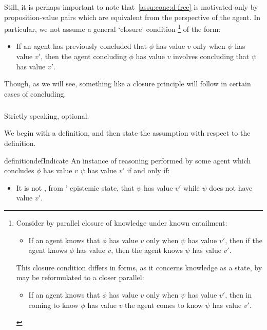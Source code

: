 \begin{note}[Descriptions]
  Still, it is perhaps important to note that~\autoref{assu:conc:d-free} is motivated only by proposition-value pairs which are equivalent from the perspective of the agent.
  In particular, we not assume a general `closure' condition%
  \footnote{
    Consider by parallel closure of knowledge under known entailment:
    \begin{itemize}
    \item If an agent knows that \(\phi\) has value \(v\) only when \(\psi\) has value \(v'\), then if the agent knows \(\phi\) has value \(v\), then the agent knows \(\psi\) has value \(v'\).
    \end{itemize}
    This closure condition differs in forms, as it concerns knowledge as a state, by may be reformulated to a closer parallel:
        \begin{itemize}
    \item If an agent knows that \(\phi\) has value \(v\) only when \(\psi\) has value \(v'\), then in coming to know \(\phi\) has value \(v\) the agent comes to know \(\psi\) has value \(v'\).
    \end{itemize}
  }
  of the form:
  \begin{itemize}
  \item If an agent has previously concluded that \(\phi\) has value \(v\) only when \(\psi\) has value \(v'\), then the agent concluding \(\phi\) has value \(v\) involves concluding that \(\psi\) has value \(v'\).
  \end{itemize}

  Though, as we will see, something like a closure principle will follow in certain cases of concluding.
\end{note}

\subparagraph{}

\begin{note}
  Strictly speaking, optional.

  We begin with a definition, and then state the assumption with respect to the definition.
\end{note}

\begin{note}
  \begin{restatable}[\indicateN{2}]{definition}{defIndicate}
    \label{def:indication}
    An instance of reasoning performed by some agent \vAgent{} which concludes \(\phi\) has value \(v\) \emph{} \(\psi\) has value \(v'\) if and only if:
    \begin{itemize}
    \item
      It is not \epPAd{}, from \vAgent{}' epistemic state, that \(\psi\) has value \(v'\) while \(\psi\) does not have value \(v'\).
    \end{itemize}
    \vspace{-\baselineskip}
  \end{restatable}
\end{note}

